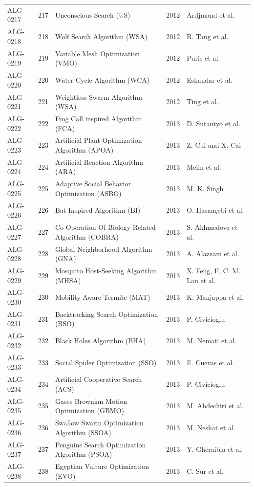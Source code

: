 \documentclass[8pt]{article}
\begin{document}
\begin{landscape}
\begin{longtable}{P{1.7cm}rP{10.0cm}rP{7.2cm}}
ALG-0217 & 217 & Unconscious Search (US) & 2012 & Ardjmand et al. \\
ALG-0218 & 218 & Wolf Search Algorithm (WSA) & 2012 & R. Tang et al. \\
ALG-0219 & 219 & Variable Mesh Optimization (VMO) & 2012 & Puris et al. \\
ALG-0220 & 220 & Water Cycle Algorithm (WCA) & 2012 & Eskandar et al. \\
ALG-0221 & 221 & Weightless Swarm Algorithm (WSA) & 2012 & Ting et al. \\
ALG-0222 & 222 & Frog Call inspired Algorithm (FCA) & 2013 & D. Sutantyo et al. \\
ALG-0223 & 223 & Artificial Plant Optimization Algorithm (APOA) & 2013 & Z. Cui and X. Cai \\
ALG-0224 & 224 & Artificial Reaction Algorithm (ARA) & 2013 & Melin et al. \\
ALG-0225 & 225 & Adaptive Social Behavior Optimization (ASBO) & 2013 & M. K. Singh \\
ALG-0226 & 226 & Bat-Inspired Algorithm (BI) & 2013 & O. Hasançebi et al. \\
ALG-0227 & 227 & Co-Operation Of Biology Related Algorithm (COBRA) & 2013 & S. Akhmedova et al. \\
ALG-0228 & 228 & Global Neighborhood Algorithm (GNA) & 2013 & A. Alazzam et al. \\
ALG-0229 & 229 & Mosquito Host-Seeking Algorithm (MHSA) & 2013 & X. Feng, F. C. M. Lau et al. \\
ALG-0230 & 230 & Mobility Aware-Termite (MAT) & 2013 & K. Manjappa et al. \\
ALG-0231 & 231 & Backtracking Search Optimization (BSO) & 2013 & P. Civicioglu \\
ALG-0232 & 232 & Black Holes Algorithm (BHA) & 2013 & M. Nemati et al. \\
ALG-0233 & 233 & Social Spider Optimization (SSO) & 2013 & E. Cuevas et al. \\
ALG-0234 & 234 & Artificial Cooperative Search (ACS) & 2013 & P. Civicioglu \\
ALG-0235 & 235 & Gases Brownian Motion Optimization (GBMO) & 2013 & M. Abdechiri et al. \\
ALG-0236 & 236 & Swallow Swarm Optimization Algorithm (SSOA) & 2013 & M. Neshat et al. \\
ALG-0237 & 237 & Penguins Search Optimization Algorithm (PSOA) & 2013 & Y. Gheraibia et al. \\
ALG-0238 & 238 & Egyptian Vulture Optimization (EVO) & 2013 & C. Sur et al. \\

\end{longtable}
\end{landscape}
\end{document}
